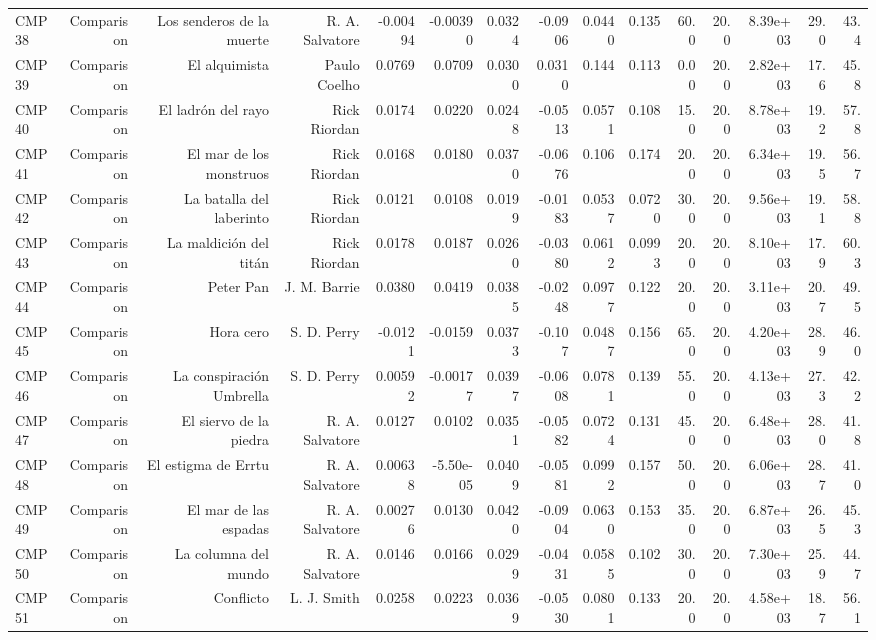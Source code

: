 \begin{table}[htbp]
\begin{tabular}{lrrrrrrrrrrrrrr}
CMP38 & Comparison & Los senderos de la muerte & R. A. Salvatore & -0.00494 & -0.00390 & 0.0324 & -0.0906 & 0.0440 & 0.135 & 60.0 & 20.0 & 8.39e+03 & 29.0 & 43.4 \\
CMP39 & Comparison & El alquimista & Paulo Coelho & 0.0769 & 0.0709 & 0.0300 & 0.0310 & 0.144 & 0.113 & 0.00 & 20.0 & 2.82e+03 & 17.6 & 45.8 \\
CMP40 & Comparison & El ladrón del rayo & Rick Riordan & 0.0174 & 0.0220 & 0.0248 & -0.0513 & 0.0571 & 0.108 & 15.0 & 20.0 & 8.78e+03 & 19.2 & 57.8 \\
CMP41 & Comparison & El mar de los monstruos & Rick Riordan & 0.0168 & 0.0180 & 0.0370 & -0.0676 & 0.106 & 0.174 & 20.0 & 20.0 & 6.34e+03 & 19.5 & 56.7 \\
CMP42 & Comparison & La batalla del laberinto & Rick Riordan & 0.0121 & 0.0108 & 0.0199 & -0.0183 & 0.0537 & 0.0720 & 30.0 & 20.0 & 9.56e+03 & 19.1 & 58.8 \\
CMP43 & Comparison & La maldición del titán & Rick Riordan & 0.0178 & 0.0187 & 0.0260 & -0.0380 & 0.0612 & 0.0993 & 20.0 & 20.0 & 8.10e+03 & 17.9 & 60.3 \\
CMP44 & Comparison & Peter Pan & J. M. Barrie & 0.0380 & 0.0419 & 0.0385 & -0.0248 & 0.0977 & 0.122 & 20.0 & 20.0 & 3.11e+03 & 20.7 & 49.5 \\
CMP45 & Comparison & Hora cero & S. D. Perry & -0.0121 & -0.0159 & 0.0373 & -0.107 & 0.0487 & 0.156 & 65.0 & 20.0 & 4.20e+03 & 28.9 & 46.0 \\
CMP46 & Comparison & La conspiración Umbrella & S. D. Perry & 0.00592 & -0.00177 & 0.0397 & -0.0608 & 0.0781 & 0.139 & 55.0 & 20.0 & 4.13e+03 & 27.3 & 42.2 \\
CMP47 & Comparison & El siervo de la piedra & R. A. Salvatore & 0.0127 & 0.0102 & 0.0351 & -0.0582 & 0.0724 & 0.131 & 45.0 & 20.0 & 6.48e+03 & 28.0 & 41.8 \\
CMP48 & Comparison & El estigma de Errtu & R. A. Salvatore & 0.00638 & -5.50e-05 & 0.0409 & -0.0581 & 0.0992 & 0.157 & 50.0 & 20.0 & 6.06e+03 & 28.7 & 41.0 \\
CMP49 & Comparison & El mar de las espadas & R. A. Salvatore & 0.00276 & 0.0130 & 0.0420 & -0.0904 & 0.0630 & 0.153 & 35.0 & 20.0 & 6.87e+03 & 26.5 & 45.3 \\
CMP50 & Comparison & La columna del mundo & R. A. Salvatore & 0.0146 & 0.0166 & 0.0299 & -0.0431 & 0.0585 & 0.102 & 30.0 & 20.0 & 7.30e+03 & 25.9 & 44.7 \\
CMP51 & Comparison & Conflicto & L. J. Smith & 0.0258 & 0.0223 & 0.0369 & -0.0530 & 0.0801 & 0.133 & 20.0 & 20.0 & 4.58e+03 & 18.7 & 56.1 \\

\end{tabular}
\end{table}
